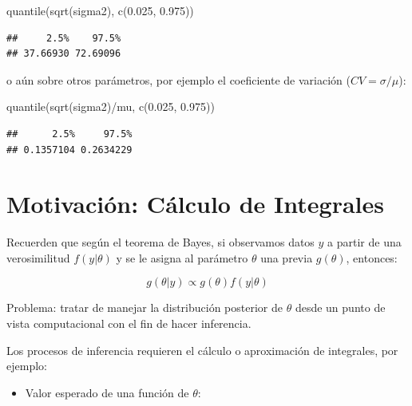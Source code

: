 \documentclass[
  12pt,
]{book}
\newenvironment{Shaded}{\begin{snugshade}}{\end{snugshade}}
\newcommand{\FloatTok}[1]{\textcolor[rgb]{0.00,0.00,0.81}{#1}}
\newcommand{\FunctionTok}[1]{\textcolor[rgb]{0.00,0.00,0.00}{#1}}
\newcommand{\NormalTok}[1]{#1}
\newcommand{\SpecialCharTok}[1]{\textcolor[rgb]{0.00,0.00,0.00}{#1}}
\providecommand{\tightlist}{%
  \setlength{\itemsep}{0pt}\setlength{\parskip}{0pt}}
\begin{document}
\begin{Shaded}
\begin{Highlighting}[]
\FunctionTok{quantile}\NormalTok{(}\FunctionTok{sqrt}\NormalTok{(sigma2), }\FunctionTok{c}\NormalTok{(}\FloatTok{0.025}\NormalTok{, }\FloatTok{0.975}\NormalTok{))}
\end{Highlighting}
\end{Shaded}

\begin{verbatim}
##     2.5%    97.5% 
## 37.66930 72.69096
\end{verbatim}

o aún sobre otros parámetros, por ejemplo el coeficiente de variación
(\(CV=\sigma/\mu\)):

\begin{Shaded}
\begin{Highlighting}[]
\FunctionTok{quantile}\NormalTok{(}\FunctionTok{sqrt}\NormalTok{(sigma2)}\SpecialCharTok{/}\NormalTok{mu, }\FunctionTok{c}\NormalTok{(}\FloatTok{0.025}\NormalTok{, }\FloatTok{0.975}\NormalTok{))}
\end{Highlighting}
\end{Shaded}

\begin{verbatim}
##      2.5%     97.5% 
## 0.1357104 0.2634229
\end{verbatim}

\hypertarget{motivaciuxf3n-cuxe1lculo-de-integrales}{%
\section{Motivación: Cálculo de
Integrales}\label{motivaciuxf3n-cuxe1lculo-de-integrales}}

Recuerden que según el teorema de Bayes, si observamos datos \(y\) a
partir de una verosimilitud \(f(y|\theta)\) y se le asigna al parámetro
\(\theta\) una previa \(g(\theta)\), entonces:

\[g(\theta|y)\propto g(\theta)f(y|\theta)\]

Problema: tratar de manejar la distribución posterior de \(\theta\)
desde un punto de vista computacional con el fin de hacer inferencia.

Los procesos de inferencia requieren el cálculo o aproximación de
integrales, por ejemplo:

\begin{itemize}
\tightlist
\item
  Valor esperado de una función de \(\theta\):
\end{itemize}
\end{document}
